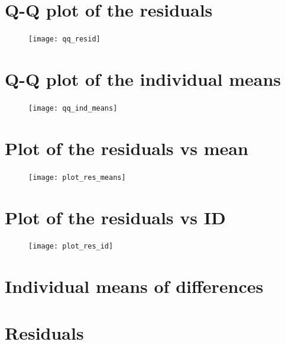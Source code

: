 \documentclass{article}\usepackage[]{graphicx}\usepackage[]{color}
\begin{document}
\section {Q-Q plot of the residuals}
\begin{figure}[H]
\centering
\texttt{[image: qq\_resid]}
\end{figure}

\section {Q-Q plot of the individual means}
\begin{figure}[H]
\centering
\texttt{[image: qq\_ind\_means]}
\end{figure}

\section {Plot of the residuals vs mean}
\begin{figure}[H]
\centering
\texttt{[image: plot\_res\_means]}
\end{figure}

\section {Plot of the residuals vs ID}
\begin{figure}[H]
\centering
\texttt{[image: plot\_res\_id]}
\end{figure}

\section {Individual means of differences}


\newpage
\section {Residuals}

\end{document}
